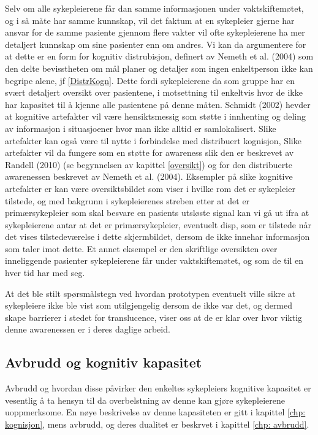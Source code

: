\noindent
Selv om alle sykepleierene får dan samme informasjonen under vaktskiftemøtet, og i så måte har samme kunnskap, vil det faktum at en sykepleier gjerne har ansvar for de samme pasiente gjennom flere vakter vil ofte sykepleierene ha mer detaljert kunnskap om sine pasienter enn om andres. Vi kan da argumentere for at dette er en form for kognitiv distrubisjon, definert av Nemeth et al. (2004) som den delte bevisstheten om mål planer og detaljer som ingen enkeltperson ikke kan begripe alene, jf \ref{DistrKogn}. Dette fordi sykepleierene da som gruppe har en svært detaljert oversikt over pasientene, i motsettning til enkeltvis hvor de ikke har kapasitet til å kjenne alle pasientene på denne måten. 
Schmidt (2002) hevder at kognitive artefakter vil være hensiktsmessig som støtte i innhenting og deling av informasjon i situasjoener hvor man ikke alltid er samlokalisert. Slike artefakter kan også være til nytte i forbindelse med distribuert kognisjon, 
Slike artefakter vil da fungere som en støtte for awareness slik den er beskrevet av Randell (2010) (se begynnelsen av kapittel \ref{oversikt}) og for den distribuerte awarenessen beskrevet av Nemeth et al. (2004).
Eksempler på slike kognitive artefakter er kan være oversiktsbildet som viser i hvilke rom det er sykepleier tilstede, og med bakgrunn i sykepleierenes streben etter at det er primærsykepleier som skal besvare en pasients utsløste signal kan vi gå ut ifra at sykepleierene antar at det er primærsykepleier, eventuelt disp, som er tilstede når det vises tilstedeværelse i dette skjermbildet, dersom de ikke innehar informasjon som taler imot dette. Et annet eksempel er den skriftlige oversikten over inneliggende pasienter sykepleierene får under vaktskiftemøtet, og som de til en hver tid har med seg.

\noindent
At det ble stilt spørsmålstegn ved hvordan prototypen eventuelt ville sikre at sykepleiere ikke ble vist som utilgjengelig dersom de ikke var det, og dermed skape barrierer i stedet for translucence, viser oss at de er klar over hvor viktig denne awarenessen er i deres daglige arbeid. 


\subsection{Avbrudd og kognitiv kapasitet}
Avbrudd og hvordan disse påvirker den enkeltes sykepleiers kognitive kapasitet er vesentlig å ta hensyn til da overbelstning av denne kan gjøre sykepleierene uoppmerksome. En nøye beskrivelse av denne kapasiteten er gitt i kapittel \ref{chp: kognisjon}, mens avbrudd, og deres dualitet er beskrvet i kapittel \ref{chp: avbrudd}. 

